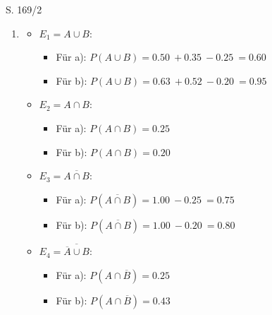 \begin{Exercise}{S. 169/2}{}
\begin{enumerate}[leftmargin=*]
    \item [2.] {
        \begin{itemize}[leftmargin=*]
            \item $E_{1} = A \cup B$: {
                \begin{itemize}[leftmargin=*]
                    \item Für a): \quad $P(A \cup B) = \SI{0.50}{} + \SI{0.35}{} - \SI{0.25}{} = \SI{0.60}{}$
                    \item Für b): \quad $P(A \cup B) = \SI{0.63}{} + \SI{0.52}{} - \SI{0.20}{} = \SI{0.95}{}$
                \end{itemize}
                }
            \item $E_{2} = A \cap B$: {
                \begin{itemize}[leftmargin=*]
                    \item Für a): \quad $P(A \cap B) = \SI{0.25}{}$
                    \item Für b): \quad $P(A \cap B) = \SI{0.20}{}$
                \end{itemize}
                }
            \item $E_{3} = \overline{A \cap B}$: {
                \begin{itemize}[leftmargin=*]
                    \item Für a): \quad $P(\overline{A \cap B}) = \SI{1.00}{} - \SI{0.25}{} = \SI{0.75}{}$
                    \item Für b): \quad $P(\overline{A \cap B}) = \SI{1.00}{} - \SI{0.20}{} = \SI{0.80}{}$
                \end{itemize}
                }
            \item $E_{4} = \overline{\overline{A} \cup B}$: {
                \begin{itemize}[leftmargin=*]
                    \item Für a): \quad $P(A \cap \overline{B}) = \SI{0.25}{}$
                    \item Für b): \quad $P(A \cap \overline{B}) = \SI{0.43}{}$
                \end{itemize}
                }
        \end{itemize}
        }
\end{enumerate}
\end{Exercise}

